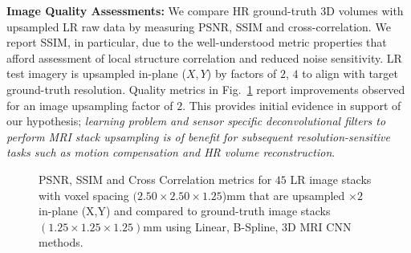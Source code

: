 \documentclass[runningheads,a4paper]{llncs}
\makeatletter
\newcommand{\todo}[1]{}
\renewcommand{\todo}[1]{{\color{red} TODO: {#1}}}
\let\origsection\section
\renewcommand\section{\@ifstar{\starsection}{\nostarsection}}
\newcommand\nostarsection[1]
{\sectionprelude\origsection{#1}\sectionpostlude}
\newcommand\starsection[1]
{\sectionprelude\origsection*{#1}\sectionpostlude}
\newcommand\sectionprelude{%
  \vspace{-2mm}
}
\newcommand\sectionpostlude{%
  \vspace{0mm}
}
\makeatother
\begin{document}

\section{Evaluation and Results}
\label{sec:results}
\noindent \textbf{Image Quality Assessments:} We compare HR ground-truth 3D volumes with upsampled LR raw data by measuring PSNR, SSIM and cross-correlation. We report SSIM, in particular, due to the well-understood metric properties that afford assessment of local structure correlation and reduced noise sensitivity. LR test imagery is upsampled in-plane ($X,Y$) by factors of $2$, $4$ to align with target ground-truth resolution. Quality metrics in Fig.~\ref{fig:boxplot} report improvements observed for an image upsampling factor of $2$. This provides initial evidence in support of our hypothesis; \emph{learning problem and sensor specific deconvolutional filters to perform MRI stack upsampling is of benefit for subsequent resolution-sensitive tasks such as motion compensation and HR volume reconstruction}.
\vspace{-9.5mm} 
\begin{figure}[H]
     \centering
     \hfill
     \hfill
     \caption{PSNR, SSIM and Cross Correlation metrics for $45$ LR image stacks with voxel spacing $(2.50\times2.50\times1.25$)mm that are upsampled $\times2$ in-plane (X,Y) and compared to ground-truth image stacks $(1.25\times 1.25\times1.25)$mm using Linear, B-Spline, 3D MRI CNN methods.}
     \label{fig:boxplot}
\end{figure}
\end{document}
